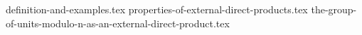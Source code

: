 \setcounter{chapter}{8}
\setcounter{section}{0}
{definition-and-examples.tex}
{properties-of-external-direct-products.tex}
{the-group-of-units-modulo-n-as-an-external-direct-product.tex}

